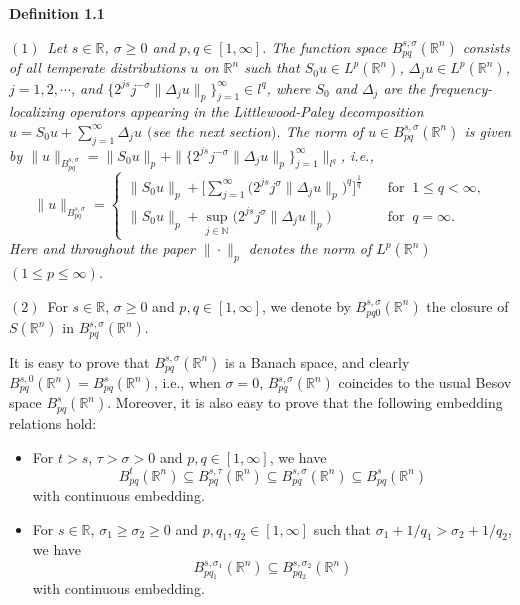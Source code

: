 \documentclass[11pt]{article}
\begin{document}
  {\bf Definition 1.1} \ \ {\em $(1)$\ Let $s\in\mathbb{R}$, $\sigma\geqslant 0$ and $p,q\in[1,\infty]$. The function space
  $B^{s,\sigma}_{pq}(\mathbb{R}^n)$ consists of all temperate distributions $u$ on $\mathbb{R}^n$ such that $S_0u\in L^p(\mathbb{R}^n)$, $\Delta_j u
  \in L^p(\mathbb{R}^n)$, $j=1,2,\cdots$, and $\{2^{js}j^{-\sigma}\|\Delta_j u\|_p\}_{j=1}^\infty\in l^q$, where $S_0$ and $\Delta_j$ are the
  frequency-localizing operators appearing in the  Littlewood-Paley decomposition $u=S_0u+\sum_{j=1}^{\infty}\Delta_j u$ $($see the next section$)$.
  The norm of $u\in B^{s,\sigma}_{pq}(\mathbb{R}^n)$ is given by $\|u\|_{B^{s,\sigma}_{pq}}=\|S_0u\|_p+\|\{2^{js}j^{-\sigma}
  \|\Delta_j u\|_p\}_{j=1}^\infty\|_{l^q}$, i.e.,
$$
  \|u\|_{B^{s,\sigma}_{pq}}=\left\{
\begin{array}{ll}
  \displaystyle\|S_0u\|_p+\Big[\sum_{j=1}^\infty\Big(2^{js}j^{\sigma}\|\Delta_j u\|_p
  \Big)^q\Big]^{\frac{1}{q}} \quad &\mbox{for}\;\; 1\leqslant q<\infty,\\ [0.3cm]
  \displaystyle\|S_0u\|_p+\sup_{j\in\mathbb{N}}\Big(2^{js}j^{\sigma}\|\Delta_j u\|_p
  \Big) \quad &\mbox{for}\;\; q=\infty.
\end{array}
\right.
$$
  Here and throughout the paper $\|\cdot\|_p$ denotes the norm of $L^p(\mathbb{R}^n)$ $(1\leqslant p\leqslant\infty)$.

  $(2)$\ For $s\in\mathbb{R}$, $\sigma\geqslant 0$ and $p,q\in[1,\infty]$, we denote by $B^{s,\sigma}_{pq0}(\mathbb{R}^n)$ the closure of
  $S(\mathbb{R}^n)$ in $B^{s,\sigma}_{pq}(\mathbb{R}^n)$.}
\medskip

  It is easy to prove that $B^{s,\sigma}_{pq}(\mathbb{R}^n)$ is a Banach space, and clearly $B^{s,0}_{pq}(\mathbb{R}^n)=B^s_{pq}(\mathbb{R}^n)$, i.e.,
  when $\sigma=0$, $B^{s,\sigma}_{pq}(\mathbb{R}^n)$ coincides to the usual Besov space $B^s_{pq}(\mathbb{R}^n)$. Moreover, it is also easy to prove
  that the following embedding relations hold:
\begin{itemize}
\item For $t>s$, $\tau>\sigma>0$ and $p,q\in[1,\infty]$, we have
$$
  B^{t}_{pq}(\mathbb{R}^n)\subseteq B^{s,\tau}_{pq}(\mathbb{R}^n)\subseteq B^{s,\sigma}_{pq}(\mathbb{R}^n)\subseteq
  B^{s}_{pq}(\mathbb{R}^n)
$$
  with continuous embedding.
\item For $s\in\mathbb{R}$, $\sigma_1\geqslant\sigma_2\geqslant 0$ and $p,q_1,q_2\in[1,\infty]$ such that $\sigma_1+1/q_1>\sigma_2+1/q_2$, we have
$$
  B^{s,\sigma_1}_{pq_1}(\mathbb{R}^n)\subseteq B^{s,\sigma_2}_{pq_2}(\mathbb{R}^n)
$$
  with continuous embedding.
\end{itemize}
\medskip
\end{document}
